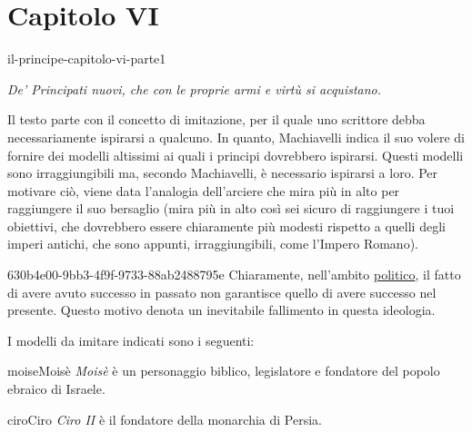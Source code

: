 \documentclass[preview]{standalone}
\begin{document}
\genpage

\section{Capitolo VI}

\begin{snippet}{il-principe-capitolo-vi-parte1}
    \begin{center}
        \begin{minipage}{0.75\textwidth}
            \itshape
            De' Principati nuovi, che con le proprie armi e virtù si acquistano. 
        \end{minipage}
    \end{center}
    \vspace{0.25cm}
    Il testo parte con il concetto di imitazione, per il quale uno scrittore
    debba necessariamente ispirarsi a qualcuno.
    In quanto, Machiavelli indica il suo volere di fornire dei modelli altissimi
    ai quali i principi dovrebbero ispirarsi.
    Questi modelli sono irraggiungibili ma, secondo Machiavelli, è necessario ispirarsi a loro.
    Per motivare ciò, viene data l'analogia dell'arciere che mira più in alto per raggiungere il suo bersaglio
    (mira più in alto così sei sicuro di raggiungere i tuoi obiettivi, che dovrebbero essere chiaramente
    più modesti rispetto a quelli degli imperi antichi, che sono appunti, irraggiungibili, come l'Impero Romano).
\end{snippet}

\begin{snippetnote}{630b4e00-9bb3-4f9f-9733-88ab2488795e}{}
    Chiaramente, nell'ambito \underline{politico}, il fatto di avere avuto successo in passato
    non garantisce quello di avere successo nel presente.
    Questo motivo denota un inevitabile fallimento in questa ideologia.
\end{snippetnote}

\begin{plainhtml}
    I modelli da imitare indicati sono i seguenti:
\end{plainhtml}

\begin{snippetcharacter}{moise}{Moisè}
    \textit{Moisè} è un personaggio biblico, legislatore e fondatore del popolo ebraico di Israele.
\end{snippetcharacter}

\begin{snippetcharacter}{ciro}{Ciro}
    \textit{Ciro II} è il fondatore della monarchia di Persia.
\end{snippetcharacter}
\end{document}

